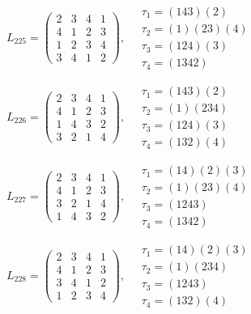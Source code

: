 $L_{225} = \begin{pmatrix} 2 & 3 & 4 & 1 \\ 4 & 1 & 2 & 3 \\ 1 & 2 & 3 & 4 \\ 3 & 4 & 1 & 2 \end{pmatrix}, \quad \begin{matrix} \tau_{1} = (1 4 3)(2) \\ \tau_{2} = (1)(2 3)(4) \\ \tau_{3} = (1 2 4)(3) \\ \tau_{4} = (1 3 4 2) \end{matrix}$

$L_{226} = \begin{pmatrix} 2 & 3 & 4 & 1 \\ 4 & 1 & 2 & 3 \\ 1 & 4 & 3 & 2 \\ 3 & 2 & 1 & 4 \end{pmatrix}, \quad \begin{matrix} \tau_{1} = (1 4 3)(2) \\ \tau_{2} = (1)(2 3 4) \\ \tau_{3} = (1 2 4)(3) \\ \tau_{4} = (1 3 2)(4) \end{matrix}$

$L_{227} = \begin{pmatrix} 2 & 3 & 4 & 1 \\ 4 & 1 & 2 & 3 \\ 3 & 2 & 1 & 4 \\ 1 & 4 & 3 & 2 \end{pmatrix}, \quad \begin{matrix} \tau_{1} = (1 4)(2)(3) \\ \tau_{2} = (1)(2 3)(4) \\ \tau_{3} = (1 2 4 3) \\ \tau_{4} = (1 3 4 2) \end{matrix}$

$L_{228} = \begin{pmatrix} 2 & 3 & 4 & 1 \\ 4 & 1 & 2 & 3 \\ 3 & 4 & 1 & 2 \\ 1 & 2 & 3 & 4 \end{pmatrix}, \quad \begin{matrix} \tau_{1} = (1 4)(2)(3) \\ \tau_{2} = (1)(2 3 4) \\ \tau_{3} = (1 2 4 3) \\ \tau_{4} = (1 3 2)(4) \end{matrix}$

